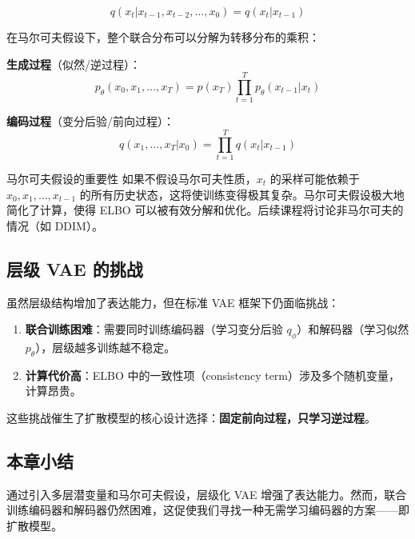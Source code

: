 $$q(x_t | x_{t-1}, x_{t-2}, \ldots, x_0) = q(x_t | x_{t-1})$$

在马尔可夫假设下，整个联合分布可以分解为转移分布的乘积：

\textbf{生成过程}（似然/逆过程）：
$$p_\theta(x_0, x_1, \ldots, x_T) = p(x_T) \prod_{t=1}^{T} p_\theta(x_{t-1} | x_t)$$

\textbf{编码过程}（变分后验/前向过程）：
$$q(x_1, \ldots, x_T | x_0) = \prod_{t=1}^{T} q(x_t | x_{t-1})$$

\begin{importantbox}{马尔可夫假设的重要性}
如果不假设马尔可夫性质，$x_t$ 的采样可能依赖于 $x_0, x_1, \ldots, x_{t-1}$ 的所有历史状态，这将使训练变得极其复杂。马尔可夫假设极大地简化了计算，使得 ELBO 可以被有效分解和优化。后续课程将讨论非马尔可夫的情况（如 DDIM）。
\end{importantbox}

\subsection{层级 VAE 的挑战}

虽然层级结构增加了表达能力，但在标准 VAE 框架下仍面临挑战：

\begin{enumerate}
    \item \textbf{联合训练困难}：需要同时训练编码器（学习变分后验 $q_\phi$）和解码器（学习似然 $p_\theta$），层级越多训练越不稳定。
    \item \textbf{计算代价高}：ELBO 中的一致性项（consistency term）涉及多个随机变量，计算昂贵。
\end{enumerate}

这些挑战催生了扩散模型的核心设计选择：\textbf{固定前向过程，只学习逆过程}。

\subsection{本章小结}

通过引入多层潜变量和马尔可夫假设，层级化 VAE 增强了表达能力。然而，联合训练编码器和解码器仍然困难，这促使我们寻找一种无需学习编码器的方案——即扩散模型。


